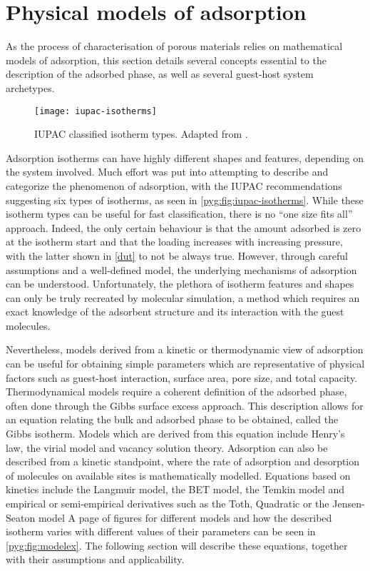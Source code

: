 
\section{Physical models of adsorption}%
\label{pyg:models}

As the process of characterisation of porous materials
relies on mathematical models of adsorption, this section 
details several concepts essential to the description of the 
adsorbed phase, as well as several guest-host system archetypes.

\begin{figure}[htb]
	\centering
	\texttt{[image: iupac-isotherms]}
	\caption{
		\gls{IUPAC} classified isotherm types. 
		Adapted from \citet{thommesPhysisorptionGasesSpecial2015}.
	}\label{pyg:fig:iupac-isotherms}
\end{figure}

Adsorption isotherms can have highly different shapes and features,
depending on the system involved. 
Much effort was put into attempting to describe and categorize
the phenomenon of adsorption, with the \gls{IUPAC} recommendations suggesting
six types of isotherms, as seen in \autoref{pyg:fig:iupac-isotherms}. 
While these isotherm types can be useful for fast classification, 
there is no ``one size fits all'' approach. Indeed, the only 
certain behaviour is that the amount adsorbed is zero at
the isotherm start and that the loading increases with increasing 
pressure, with the latter shown in \autoref{dut} to not be 
always true. However, through careful assumptions and a well-defined
model, the underlying mechanisms of adsorption can be understood.
Unfortunately, the plethora of isotherm features and shapes can only
be truly recreated by molecular simulation, a method which requires an
exact knowledge of the adsorbent structure and its interaction
with the guest molecules.

Nevertheless, models derived from a kinetic or thermodynamic
view of adsorption can be useful for obtaining simple parameters
which are representative of physical factors such as
guest-host interaction, surface area, pore size,
and total capacity. Thermodynamical models require a coherent
definition of the adsorbed phase, often done through the 
Gibbs surface excess approach. This description allows for an equation 
relating the bulk and adsorbed phase to be obtained, called
the Gibbs isotherm. Models which are derived from this equation include
Henry's law, the virial model and vacancy solution theory.
Adsorption can also be described from a kinetic standpoint, where
the rate of adsorption and desorption of molecules on
available sites is mathematically modelled. Equations based
on kinetics include the Langmuir model, the \gls{BET} model,
the Temkin model and empirical or semi-empirical derivatives
such as the Toth, Quadratic or the Jensen-Seaton model
A page of figures for different models and how the
described isotherm varies with different values of
their parameters can be seen in
\autoref{pyg:fig:modelex}. The following section will describe
these equations, together with their assumptions and
applicability.

